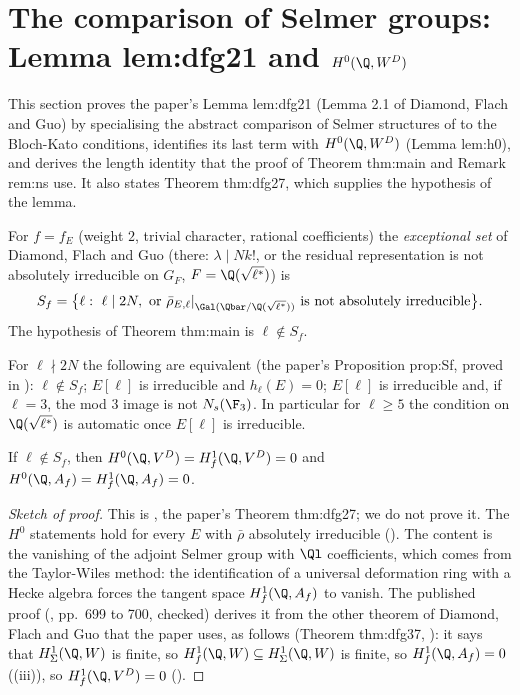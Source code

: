 \section[Lemma lem:dfg21]{The comparison of Selmer groups: Lemma lem:dfg21 and \texorpdfstring{$H^0(\Q,W^D)$}{H0(Q,WD)}}\label{sec:blochkato:comparison}

This section proves the paper's Lemma lem:dfg21 (Lemma 2.1 of Diamond, Flach and Guo) by specialising the abstract comparison of Selmer structures of
 to the Bloch-Kato conditions, identifies its last term with $H^0(\Q,W^D)$ (Lemma lem:h0), and derives the length identity that the proof of
Theorem thm:main and Remark rem:ns use. It also states Theorem thm:dfg27, which supplies the hypothesis of the lemma.

\begin{definition}\label{def:blochkato:exceptional-set}
For $f=f_E$ (weight $2$, trivial character, rational coefficients) the \emph{exceptional set} of Diamond, Flach and Guo \cite[Section 0.2 and (31)]{DFG04} (there: $\lambda\mid Nk!$, or the residual representation is not absolutely irreducible on $G_F$, $F=\Q(\sqrt{\ell^*})$) is
\[
S_f=\bigl\{\ell:\ \ell\mid2N,\ \text{or}\ \bar\rho_{E,\ell}|_{\Gal(\Qbar/\Q(\sqrt{\ell^*}))}\ \text{is not absolutely irreducible}\bigr\}.
\]
The hypothesis of Theorem thm:main is $\ell\notin S_f$.
\end{definition}

For $\ell\nmid2N$ the following are equivalent (the paper's Proposition prop:Sf, proved in ): $\ell\notin S_f$; $E[\ell]$ is irreducible and $h_\ell(E)=0$; $E[\ell]$
is irreducible and, if $\ell=3$, the mod $3$ image is not $N_s(\F_3)$. In particular for $\ell\ge5$ the condition on $\Q(\sqrt{\ell^*})$ is automatic once $E[\ell]$ is irreducible.

\begin{theorem}\label{thm:blochkato:dfg27}
If $\ell\notin S_f$, then $H^0(\Q,V^D)=H^1_f(\Q,V^D)=0$ and $H^0(\Q,A_f)=H^1_f(\Q,A_f)=0$.
\end{theorem}

\begin{proof}[Sketch of proof]
This is \cite[Theorem 2.7]{DFG04}, the paper's Theorem thm:dfg27; we do not prove it. The $H^0$ statements hold for every $E$ with $\bar\rho$ absolutely irreducible
(). The content is the vanishing of the adjoint Selmer group with $\Ql$ coefficients, which comes from the Taylor-Wiles method:
the identification of a universal deformation ring with a Hecke algebra forces the tangent space $H^1_f(\Q,A_f)$ to vanish. The published proof (\cite{DFG04}, pp.~699 to 700, checked) derives it from the
other theorem of Diamond, Flach and Guo that the paper uses, as follows (Theorem thm:dfg37, ): it says that $H^1_\Sigma(\Q,W)$ is finite, so $H^1_f(\Q,W)\subseteq H^1_\Sigma(\Q,W)$
is finite, so $H^1_f(\Q,A_f)=0$ ((iii)), so $H^1_f(\Q,V^D)=0$ ().
\end{proof}

